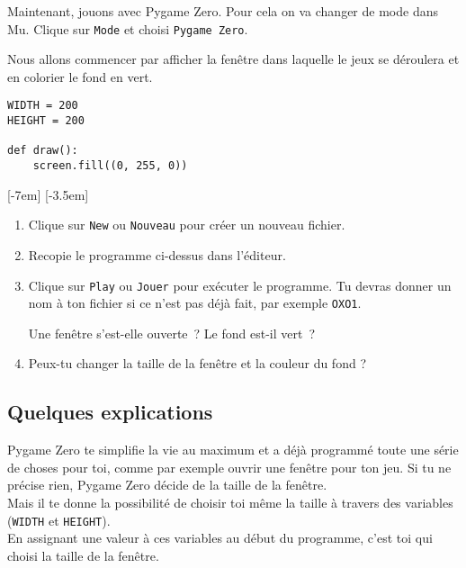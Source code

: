 \documentclass[11pt]{article}
\begin{document}
Maintenant, jouons avec Pygame Zero. Pour cela on va changer de mode dans Mu. Clique sur \texttt{Mode} et choisi \texttt{Pygame Zero}.

Nous allons commencer par afficher la fenêtre dans laquelle le jeux se déroulera et en colorier le fond en vert.

\begin{lstlisting}
WIDTH = 200
HEIGHT = 200

def draw():
    screen.fill((0, 255, 0))
\end{lstlisting}
\marginnote{\textcolor{deepblue}{WIDTH~=~largeur\\HEIGHT~=~hauteur}}[-7em]
\marginnote{\textcolor{deepblue}{draw~=~dessiner\\screen~=~écran\\fill~=~remplir}}[-3.5em]

\begin{enumerate}
    \item Clique sur \texttt{New} ou \texttt{Nouveau} pour créer un nouveau fichier.

    \item Recopie le programme ci-dessus dans l'éditeur.
    
    \item Clique sur \texttt{Play} ou \texttt{Jouer} pour exécuter le programme. Tu devras donner un nom à ton fichier si ce n'est pas déjà fait, par exemple \texttt{OXO1}.

          Une fenêtre s'est-elle ouverte~?
          Le fond est-il vert~?

    \item Peux-tu changer la taille de la fenêtre et la couleur du fond ?
\end{enumerate}

\subsection*{Quelques explications}

Pygame Zero te simplifie la vie au maximum et a déjà programmé toute une série de choses pour toi, comme par exemple ouvrir une fenêtre pour ton jeu. Si tu ne précise rien, Pygame Zero décide de la taille de la fenêtre.\\
Mais il te donne la possibilité de choisir toi même la taille à travers des variables (\lstinline{WIDTH} et \lstinline{HEIGHT}).\\
En assignant une valeur à ces variables au début du programme, c'est toi qui choisi la taille de la fenêtre.
\end{document}
